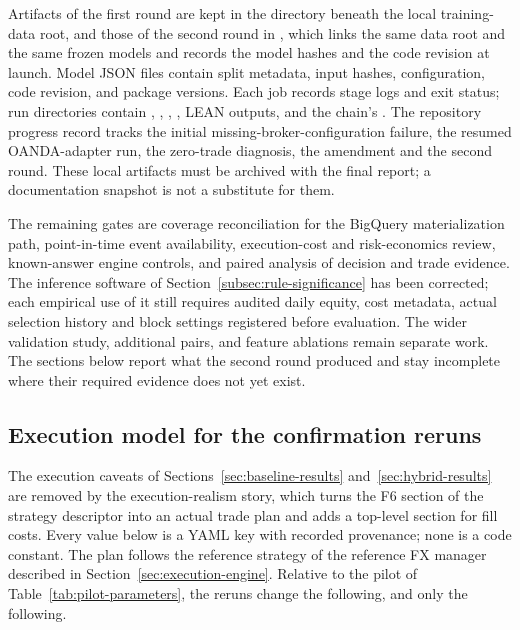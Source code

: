 Artifacts of the first round are kept in the directory  beneath the local training-data root, and those of the second round in , which links the same data root and the same frozen models and records the model hashes and the code revision at launch. Model JSON files contain split metadata, input hashes, configuration, code revision, and package versions. Each job records stage logs and exit status; run directories contain , , , , LEAN outputs, and the chain's . The repository progress record tracks the initial missing-broker-configuration failure, the resumed OANDA-adapter run, the zero-trade diagnosis, the amendment and the second round. These local artifacts must be archived with the final report; a documentation snapshot is not a substitute for them.

The remaining gates are coverage reconciliation for the BigQuery materialization path, point-in-time event availability, execution-cost and risk-economics review, known-answer engine controls, and paired analysis of decision and trade evidence. The inference software of Section~\ref{subsec:rule-significance} has been corrected; each empirical use of it still requires audited daily equity, cost metadata, actual selection history and block settings registered before evaluation. The wider validation study, additional pairs, and feature ablations remain separate work. The sections below report what the second round produced and stay incomplete where their required evidence does not yet exist.

\subsection{Execution model for the confirmation reruns} \label{subsec:execution-model}

The execution caveats of Sections~\ref{sec:baseline-results} and~\ref{sec:hybrid-results} are removed by the execution-realism story, which turns the F6 section of the strategy descriptor into an actual trade plan and adds a top-level  section for fill costs. Every value below is a YAML key with recorded provenance; none is a code constant. The plan follows the reference strategy of the reference FX manager described in Section~\ref{sec:execution-engine}. Relative to the pilot of Table~\ref{tab:pilot-parameters}, the reruns change the following, and only the following.

